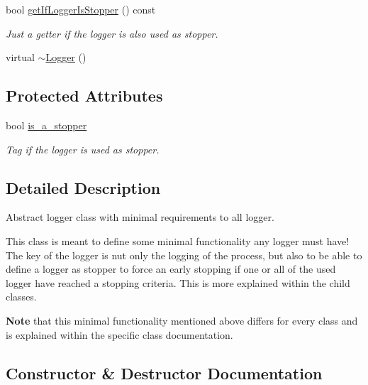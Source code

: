 \begin{DoxyCompactItemize}
bool \hyperlink{classlogger_1_1_logger_ae39cfa15ba833840ae52889c09cac994}{get\+If\+Logger\+Is\+Stopper} () const
\begin{DoxyCompactList}\small\item\em Just a getter if the logger is also used as stopper. \end{DoxyCompactList}\item 
virtual \hyperlink{classlogger_1_1_logger_aa85a309d218f9f006600cbaf2a348f52}{$\sim$\+Logger} ()
\end{DoxyCompactItemize}
\subsection*{Protected Attributes}
\begin{DoxyCompactItemize}
\item 
bool \hyperlink{classlogger_1_1_logger_a57ca2ab531e0a7ac74f4ecd4b74a938f}{is\+\_\+a\+\_\+stopper}
\begin{DoxyCompactList}\small\item\em Tag if the logger is used as stopper. \end{DoxyCompactList}\end{DoxyCompactItemize}


\subsection{Detailed Description}
Abstract logger class with minimal requirements to all logger. 

This class is meant to define some minimal functionality any logger must have! The key of the logger is nut only the logging of the process, but also to be able to define a logger as stopper to force an early stopping if one or all of the used logger have reached a stopping criteria. This is more explained within the child classes.

{\bfseries Note} that this minimal functionality mentioned above differs for every class and is explained within the specific class documentation. 

\subsection{Constructor \& Destructor Documentation}
\mbox{\label{classlogger_1_1_logger_aa85a309d218f9f006600cbaf2a348f52}} 
